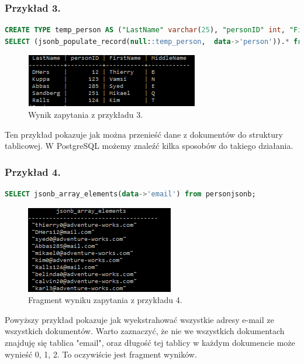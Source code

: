 \documentclass[a4paper,12pt,table]{article}
\begin{document}
{\subsubsection*{Przykład 3.}
\begin{lstlisting}[language=SQL,basicstyle=\footnotesize]
CREATE TYPE temp_person AS ("LastName" varchar(25), "personID" int, "FirstName" varchar(25), "MiddleName" varchar(25));
SELECT (jsonb_populate_record(null::temp_person,  data->'person')).* from public.personjsonb LIMIT 5;
\end{lstlisting}
\vspace{0.5cm}
\begin{figure}[h]
\begin{center}
\includegraphics[scale=0.9]{sc/33}
\end{center}
\caption{Wynik zapytania z przykładu 3.}
\end{figure}%
Ten przykład pokazuje jak można przenieść dane z dokumentów do struktury tablicowej. W PostgreSQL możemy znaleźć kilka sposobów do takiego działania.
\subsubsection*{Przykład 4.}
\begin{lstlisting}[language=SQL,basicstyle=\footnotesize]
SELECT jsonb_array_elements(data->'email') from personjsonb;
\end{lstlisting}
\vspace{0.5cm}
\begin{figure}[h]
\begin{center}
\includegraphics[scale=1]{sc/34}
\end{center}
\caption{Fragment wyniku zapytania z przykładu 4.}
\end{figure}%
Powyższy przykład pokazuje jak wyekstrahować wszystkie adresy e-mail ze wszystkich dokumentów. Warto zaznaczyć, że nie we wszystkich dokumentach znajduję się tablica "email", oraz długość tej tablicy w każdym dokumencie może wynieść 0, 1, 2. To oczywiście jest fragment wyników.
}
\end{document}
